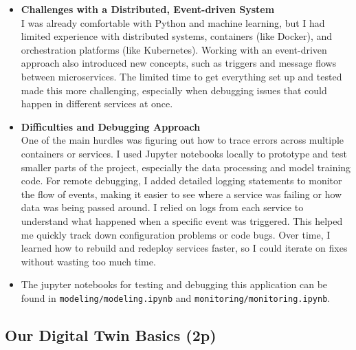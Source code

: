 \documentclass[A4,10pt]{article}
\begin{document}
\begin{itemize}
    \item \textbf{Challenges with a Distributed, Event-driven System} \\
    I was already comfortable with Python and machine learning, but I had limited experience with distributed systems, containers (like Docker), and orchestration platforms (like Kubernetes). Working with an event-driven approach also introduced new concepts, such as triggers and message flows between microservices. The limited time to get everything set up and tested made this more challenging, especially when debugging issues that could happen in different services at once.

    \item \textbf{Difficulties and Debugging Approach} \\
    One of the main hurdles was figuring out how to trace errors across multiple containers or services. I used Jupyter notebooks locally to prototype and test smaller parts of the project, especially the data processing and model training code. For remote debugging, I added detailed logging statements to monitor the flow of events, making it easier to see where a service was failing or how data was being passed around. I relied on logs from each service to understand what happened when a specific event was triggered. This helped me quickly track down configuration problems or code bugs. Over time, I learned how to rebuild and redeploy services faster, so I could iterate on fixes without wasting too much time.

    \item The jupyter notebooks for testing and debugging this application can be found in \texttt{modeling/modeling.ipynb} and \texttt{monitoring/monitoring.ipynb}.
\end{itemize}


\subsection{Our Digital Twin Basics (2p)}
\label{sec:digital_twin_basics}
\end{document}
